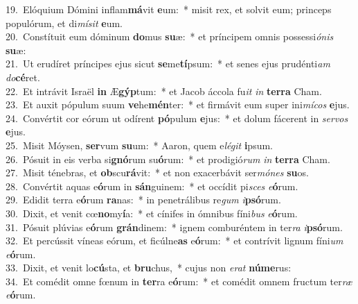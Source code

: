 {19.~}Elóquium Dómini inflam\textbf{má}vit \textbf{e}um:~* misit rex, et solvit eum; princeps populórum, et di\textit{mí}\textit{sit} \textbf{e}um.\\
{20.~}Constítuit eum dóminum \textbf{do}mus \textbf{su}æ:~* et príncipem omnis possessi\textit{ó}\textit{nis} \textbf{su}æ:\\
{21.~}Ut erudíret príncipes ejus sicut \textbf{se}me\textbf{tí}psum:~* et senes ejus prudénti\textit{am} \textit{do}\textbf{cé}ret.\\
{22.~}Et intrávit Israël \textbf{in} Æ\textbf{gýp}tum:~* et Jacob áccola fu\textit{it} \textit{in} \textbf{ter}\textbf{ra} Cham.\\
{23.~}Et auxit pópulum suum \textbf{ve}he\textbf{mén}ter:~* et firmávit eum super ini\textit{mí}\textit{cos} \textbf{e}jus.\\
{24.~}Convértit cor eórum ut odírent \textbf{pó}pulum \textbf{e}jus:~* et dolum fácerent in \textit{ser}\textit{vos} \textbf{e}jus.\\
{25.~}Misit Móysen, \textbf{ser}vum \textbf{su}um:~* Aaron, quem e\textit{lé}\textit{git} \textbf{i}psum.\\
{26.~}Pósuit in eis verba si\textbf{gnó}rum su\textbf{ó}rum:~* et prodigió\textit{rum} \textit{in} \textbf{ter}\textbf{ra} Cham.\\
{27.~}Misit ténebras, et \textbf{ob}scu\textbf{rá}vit:~* et non exacerbávit ser\textit{mó}\textit{nes} \textbf{su}os.\\
{28.~}Convértit aquas e\textbf{ó}rum in \textbf{sán}guinem:~* et occídit pi\textit{sces} \textit{e}\textbf{ó}rum.\\
{29.~}Edidit terra e\textbf{ó}rum \textbf{ra}nas:~* in penetrálibus re\textit{gum} \textit{i}\textbf{psó}rum.\\
{30.~}Dixit, et venit cœ\textbf{no}my\textbf{í}a:~* et cínifes in ómnibus fíni\textit{bus} \textit{e}\textbf{ó}rum.\\
{31.~}Pósuit plúvias e\textbf{ó}rum \textbf{grán}dinem:~* ignem comburéntem in ter\textit{ra} \textit{i}\textbf{psó}rum.\\
{32.~}Et percússit víneas eórum, et ficúlne\textbf{as} e\textbf{ó}rum:~* et contrívit lignum fíni\textit{um} \textit{e}\textbf{ó}rum.\\
{33.~}Dixit, et venit lo\textbf{cú}sta, et \textbf{bru}chus,~* cujus non \textit{e}\textit{rat} \textbf{nú}\textbf{me}rus:\\
{34.~}Et comédit omne fœnum in \textbf{ter}ra e\textbf{ó}rum:~* et comédit omnem fructum ter\textit{ræ} \textit{e}\textbf{ó}rum.\\
